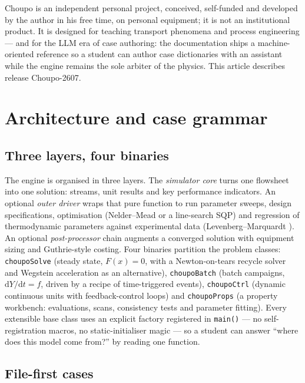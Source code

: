 \documentclass[11pt,a4paper]{article}
\newcommand{\code}[1]{\texttt{#1}}
\begin{document}
Choupo is an independent personal project, conceived, self-funded and
developed by the author in his free time, on personal equipment; it is not
an institutional product.  It is designed for teaching transport phenomena
and process engineering --- and for the LLM era of case authoring: the
documentation ships a machine-oriented reference so a student can author
case dictionaries with an assistant while the engine remains the sole
arbiter of the physics.  This article describes release Choupo-2607.

\section{Architecture and case grammar}

\subsection{Three layers, four binaries}

The engine is organised in three layers.  The \emph{simulator core} turns
one flowsheet into one solution: streams, unit results and key performance
indicators.  An optional \emph{outer driver} wraps that pure function to
run parameter sweeps, design specifications, optimisation
(Nelder--Mead \citep{nelder1965} or a line-search SQP) and regression of
thermodynamic parameters against experimental data
(Levenberg--Marquardt \citep{marquardt1963}).  An optional
\emph{post-processor} chain augments a converged solution with equipment
sizing and Guthrie-style costing.  Four binaries partition the problem
classes: \code{choupoSolve} (steady state, $F(x)=0$, with a
Newton-on-tears recycle solver and Wegstein acceleration
\citep{wegstein1958} as an alternative), \code{choupoBatch} (batch
campaigns, $\mathrm{d}Y/\mathrm{d}t=f$, driven by a recipe of
time-triggered events), \code{choupoCtrl} (dynamic continuous units with
feedback-control loops) and \code{choupoProps} (a property workbench:
evaluations, scans, consistency tests and parameter fitting).  Every
extensible base class uses an explicit factory registered in
\code{main()} --- no self-registration macros, no static-initialiser
magic --- so a student can answer ``where does this model come from?'' by
reading one function.

\subsection{File-first cases}
\end{document}
